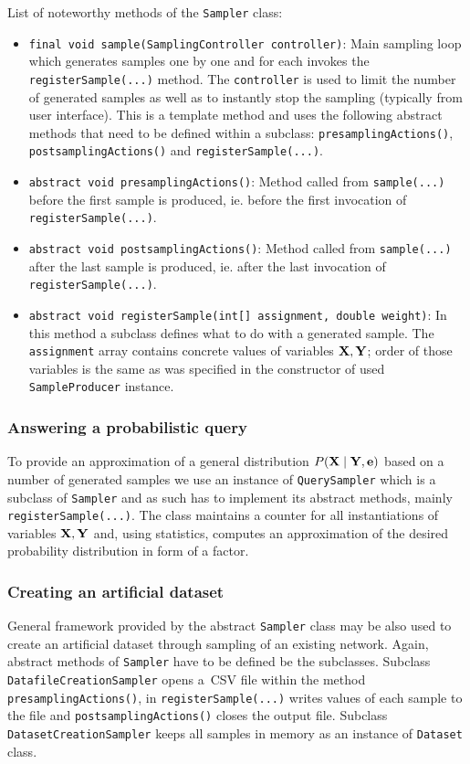 \documentclass[english,cover]{fitthesis} %
\newcommand{\srccode}[1]{{\tt #1}}         %
\newcommand{\vars}[1]{{\bold{#1}}}         %
\begin{document}
\medskip
List of noteworthy methods of the \srccode{Sampler} class:
\begin{itemize}
	\item \srccode{final void sample(SamplingController controller)}: Main sampling loop which generates samples one by one and for each invokes the \srccode{registerSample(...)} method. The \srccode{controller} is used to limit the number of generated samples as well as to instantly stop the sampling (typically from user interface). This is a template method and uses the following abstract methods that need to be defined within a subclass: \srccode{presamplingActions()}, \srccode{postsamplingActions()} and \srccode{registerSample(...)}.
	\item \srccode{abstract void presamplingActions()}: Method called from \srccode{sample(...)} before the first sample is produced, ie. before the first invocation of \srccode{registerSample(...)}.
	\item \srccode{abstract void postsamplingActions()}: Method called from \srccode{sample(...)} after the last sample is produced, ie. after the last invocation of \srccode{registerSample(...)}.
	\item \srccode{abstract void registerSample(int[] assignment, double weight)}: In this me\-thod a subclass defines what to do with a generated sample. The \srccode{assignment} array contains concrete values of variables $\vars{X},\vars{Y}$; order of those variables is the same as was specified in the constructor of used \srccode{SampleProducer} instance.
\end{itemize}


\subsubsection{Answering a probabilistic query}
To provide an approximation of a general distribution $P(\vars{X} \mid \vars{Y}, \vars{e})$ based on a number of generated samples we use an instance of \srccode{QuerySampler} which is a subclass of \srccode{Sampler} and as such has to implement its abstract methods, mainly \srccode{registerSample(...)}. The class maintains a counter for all instantiations of variables $\vars{X},\vars{Y}$ and, using statistics, computes an approximation of the desired probability distribution in form of a factor.


\subsubsection{Creating an artificial dataset}
General framework provided by the abstract \srccode{Sampler} class may be also used to create an artificial dataset through sampling of an existing network. Again, abstract methods of \srccode{Sampler} have to be defined be the subclasses. Subclass \srccode{DatafileCreationSampler} opens a~CSV file within the method \srccode{presamplingActions()}, in \srccode{registerSample(...)} writes values of each sample to the file and \srccode{postsamplingActions()} closes the output file. Subclass \srccode{DatasetCreationSampler} keeps all samples in memory as an instance of \srccode{Dataset} class.
\end{document}
